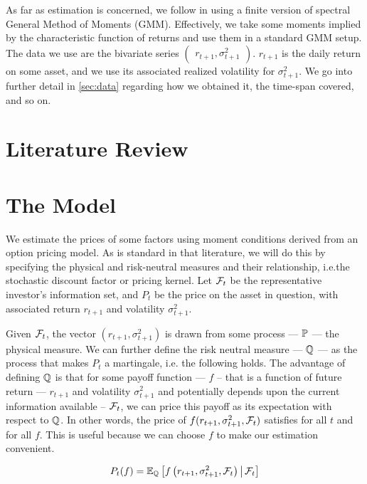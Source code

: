 \documentclass[11pt, letterpaper, twoside, final]{article}
\begin{document}
As far as estimation is concerned, we follow \textcite{khrapov2016affine} in using a finite version of spectral
General Method of Moments (GMM).
Effectively, we take some moments implied by the characteristic function of returns and use them in a standard GMM
setup.
The data we use are the bivariate series $\begin{pmatrix} r_{t+1}, \sigma^2_{t+1} \end{pmatrix}$.
$r_{t+1}$ is the daily return on some asset, and we use its associated realized volatility for $\sigma^2_{t+1}$.
We go into further detail in \cref{sec:data} regarding how we obtained it, the time-span covered, and so on.

\section{Literature Review}\label{sec:lit_review}


\section{The Model}\label{sec:model}

\addtocounter{subsection}{1}

We estimate the prices of some factors using moment conditions derived from an option pricing model. 
As is standard in that literature, we will do  this by specifying the physical and risk-neutral measures and their
relationship, i.e.\@ the stochastic discount factor or pricing kernel.
Let $\mathcal{F}_t$ be the representative investor's information set, and $P_t$ be the price on the asset in question, with
associated return $r_{t+1}$ and volatility  $\sigma^2_{t+1}$.

Given $\mathcal{F}_{t}$, the vector $\left( r_{t+1},  \sigma^2_{t+1}\right)$ is drawn from some process --- $\mathbb{P}$ --- the
physical measure. 
We can further define the risk neutral measure --- $\mathbb{Q}$ ---  as the process that makes $P_t$ a martingale, i.e.\@
the following holds. 
The advantage of defining $\mathbb{Q}$ is that for some payoff function --- $f$  -- that is a function of future return
--- $r_{t+1}$ and volatility $\sigma^2_{t+1}$ and potentially depends upon the current information available --
$\mathcal{F}_t$, we can price this payoff as its expectation with respect to $\mathbb{Q}$.
In other  words, the price of $f(r_{t+1}, \sigma^2_{t+1}, \mathcal{F}_t)$ satisfies for all $t$ and for all $f$.
This is useful because we can choose $f$ to make our estimation convenient.

\begin{equation}
    P_t(f) = \operatorname{\mathbb{E}}_{\mathbb{Q}}\left[ f\left(r_{t+1}, \sigma^2_{t+1}, \mathcal{F}_{t}\right)  \,\middle\vert\, \mathcal{F}_{t}\right]
\end{equation}
\end{document}

